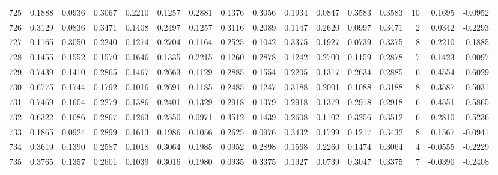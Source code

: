 \begin{tabular}{lrrrrrrrrrrrrrrr}
725 &      0.1888 &  0.0936 &  0.3067 &  0.2210 &  0.1257 &  0.2881 &  0.1376 &  0.3056 &  0.1934 &  0.0847 &   0.3583 &     0.3583 &     10 &                    0.1695 &                    -0.0952 \\
726 &      0.3129 &  0.0836 &  0.3471 &  0.1408 &  0.2497 &  0.1257 &  0.3116 &  0.2089 &  0.1147 &  0.2620 &   0.0997 &     0.3471 &      2 &                    0.0342 &                    -0.2293 \\
727 &      0.1165 &  0.3050 &  0.2240 &  0.1274 &  0.2704 &  0.1164 &  0.2525 &  0.1042 &  0.3375 &  0.1927 &   0.0739 &     0.3375 &      8 &                    0.2210 &                     0.1885 \\
728 &      0.1455 &  0.1552 &  0.1570 &  0.1646 &  0.1335 &  0.2215 &  0.1260 &  0.2878 &  0.1242 &  0.2700 &   0.1159 &     0.2878 &      7 &                    0.1423 &                     0.0097 \\
729 &      0.7439 &  0.1410 &  0.2865 &  0.1467 &  0.2663 &  0.1129 &  0.2885 &  0.1554 &  0.2205 &  0.1317 &   0.2634 &     0.2885 &      6 &                   -0.4554 &                    -0.6029 \\
730 &      0.6775 &  0.1744 &  0.1792 &  0.1016 &  0.2691 &  0.1185 &  0.2485 &  0.1247 &  0.3188 &  0.2001 &   0.1088 &     0.3188 &      8 &                   -0.3587 &                    -0.5031 \\
731 &      0.7469 &  0.1604 &  0.2279 &  0.1386 &  0.2401 &  0.1329 &  0.2918 &  0.1379 &  0.2918 &  0.1379 &   0.2918 &     0.2918 &      6 &                   -0.4551 &                    -0.5865 \\
732 &      0.6322 &  0.1086 &  0.2867 &  0.1263 &  0.2550 &  0.0971 &  0.3512 &  0.1439 &  0.2608 &  0.1102 &   0.3256 &     0.3512 &      6 &                   -0.2810 &                    -0.5236 \\
733 &      0.1865 &  0.0924 &  0.2899 &  0.1613 &  0.1986 &  0.1056 &  0.2625 &  0.0976 &  0.3432 &  0.1799 &   0.1217 &     0.3432 &      8 &                    0.1567 &                    -0.0941 \\
734 &      0.3619 &  0.1390 &  0.2587 &  0.1018 &  0.3064 &  0.1985 &  0.0952 &  0.2898 &  0.1568 &  0.2260 &   0.1474 &     0.3064 &      4 &                   -0.0555 &                    -0.2229 \\
735 &      0.3765 &  0.1357 &  0.2601 &  0.1039 &  0.3016 &  0.1980 &  0.0935 &  0.3375 &  0.1927 &  0.0739 &   0.3047 &     0.3375 &      7 &                   -0.0390 &                    -0.2408 \\

\end{tabular}
